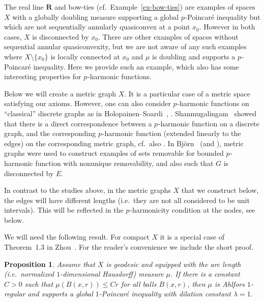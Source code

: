 \documentclass[a4paper,twoside]{article}
\theoremstyle{propositional}
\newtheorem{prop}[thm]{Proposition}
\theoremstyle{descriptive}
\theoremstyle{remarkstyle}
\newcommand{\setm}{\setminus}
\newcommand{\la}{\lambda}
\newcommand{\p}{{$p\mspace{1mu}$}}
\newcommand{\R}{\mathbf{R}}
\numberwithin{equation}{section}
\begin{document}
The real line $\R$ and bow-ties (cf.\ Example~\ref{ex-bow-ties})
are  examples of
spaces $X$ with a globally doubling measure supporting a global \p-Poincar\'e inequality
but which are not sequentially annularly quasiconvex at a point $x_0$.
However in both cases, $X$ is disconnected by $x_0$.
There are other examples of spaces without sequential annular quasiconvexity,
but we are not aware of any such examples where
$X \setm \{x_0\}$ is locally connected at $x_0$ and $\mu$ is doubling and supports 
a \p-Poincar\'e inequality.
Here we provide such an example, which also has some
interesting properties for \p-harmonic functions.




Below we will create a metric graph $X$. 
It is a particular case of a metric space satisfying our axioms.
However, one can also consider \p-harmonic functions on ``classical'' discrete graphs
as in Holopainen--Soardi~\cite{HoSo1}, \cite{HoSo2}.
Shan\-mu\-ga\-lin\-gam~\cite{Sh-conv} showed that there is a direct
correspondence between a \p-harmonic function on a discrete graph,
and the corresponding \p-harmonic function (extended linearly to the edges)
on the corresponding metric graph, cf.\  also \cite[Section~A.5]{BBbook}.
In Bj\"orn~\cite[Section~10]{ABremove} (and \cite[Section~12.4]{BBbook}), 
metric graphs were used to construct
examples of sets removable for bounded \p-harmonic function with nonunique removability, and also
such that $G$ is disconnected by $E$.

In contrast to the studies above, in the metric graphs $X$ that we construct below,
the edges will have different lengths (i.e.\ they are not all considered to be unit intervals).
This will be reflected in the \p-harmonicity condition at the nodes, see below.



We will need the following result.
For compact $X$ it is a special
case of Theorem~1.3 in Zhou~\cite{Xiaodan19}.
For the reader's convenience we include the short proof.



\begin{prop} \label{prop-PI-arc-length}
  Assume that $X$ is geodesic 
and equipped with the arc length\/ \textup(i.e.\ normalized 
$1$-dimensional  Hausdorff\/\textup) measure $\mu$.  
If there is a constant $C>0$ such that
$\mu(B(x,r)) \le Cr$ for all balls $B(x,r)$,
then $\mu$ is Ahlfors $1$-regular and 
supports a global $1$-Poincar\'e inequality with dilation constant $\la=1$.
\end{prop}
\end{document}
